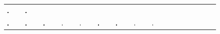 \documentclass[letterpaper]{article} %
\begin{document}
\begin{figure}[!h]
\begin{tabular}{ C{1.07cm}C{1.07cm}C{1.07cm}C{1.07cm}C{1.07cm}C{1.07cm}C{1.07cm}C{1.07cm}C{1.07cm}C{1.07cm}C{1.07cm}C{1.07cm}C{1.07cm}C{1.07cm}C{1.07cm}C{1.07cm} }
    \includegraphics[width=0.070\textwidth]{"images/supp_fig_mnist/seq_1/pred_6"}&
    \includegraphics[width=0.070\textwidth]{"images/supp_fig_mnist/seq_1/pred_7"}\\
    
    \includegraphics[width=0.070\textwidth]{"images/supp_fig_mnist/seq_2/t_m_3"} &
    \includegraphics[width=0.070\textwidth]{"images/supp_fig_mnist/seq_2/t_m_2"} &
    \includegraphics[width=0.070\textwidth]{"images/supp_fig_mnist/seq_2/t_m_1"} &
    \includegraphics[width=0.070\textwidth]{"images/supp_fig_mnist/seq_2/t_m_0"} &
    \includegraphics[width=0.070\textwidth]{"images/supp_fig_mnist/seq_2/pred_0"}&
    \includegraphics[width=0.070\textwidth]{"images/supp_fig_mnist/seq_2/pred_1"}&
    \includegraphics[width=0.070\textwidth]{"images/supp_fig_mnist/seq_2/pred_2"}&
    \includegraphics[width=0.070\textwidth]{"images/supp_fig_mnist/seq_2/pred_3"}&
    \includegraphics[width=0.070\textwidth]{"images/supp_fig_mnist/seq_2/pred_4"}&

\end{tabular}
\end{figure}
\end{document}
